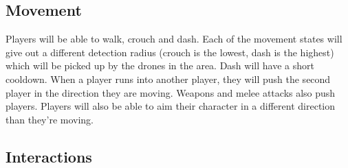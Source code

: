 \documentclass[10pt]{report}
\begin{document}
\subsection{Movement}

Players will be able to walk, crouch and dash. Each of the movement states will give out a different detection radius (crouch is the lowest, dash is the highest) which will be picked up by the drones in the area. Dash will have a short cooldown. When a player runs into another player, they will push the second player in the direction they are moving. Weapons and melee attacks also push players. Players will also be able to aim their character in a different direction than they’re moving.

\subsection{Interactions}
\end{document}
